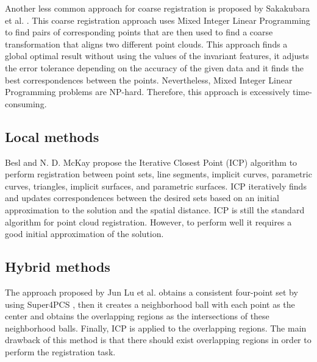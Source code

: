         Another less common approach for coarse registration is proposed by Sakakubara et al. \cite{Sakakubara_2007_automatic}.
        This coarse registration approach uses Mixed Integer Linear Programming to find pairs of corresponding points that are then 
        used to find a coarse transformation that aligns two different point clouds.
        This approach finds a global optimal result without using the values of the invariant features, 
        it adjusts the error tolerance depending on the accuracy of the given data and 
        it finds the best correspondences between the points.
        Nevertheless, Mixed Integer Linear Programming problems are NP-hard. Therefore, this approach is excessively time-consuming.

        \subsection{Local methods}

        Besl and N. D. McKay \cite{Besl_1992_amethod} propose the Iterative Closest Point (ICP) algorithm to perform registration 
        between point sets, line segments, implicit curves, parametric curves, triangles, implicit surfaces, and parametric surfaces.
        ICP iteratively finds and updates correspondences between the desired sets based on an initial approximation to the solution and 
        the spatial distance.
        ICP is still the standard algorithm for point cloud registration. However, to perform well it requires a good initial
        approximation of the solution.

        \subsection{Hybrid methods}

        The approach proposed by Jun Lu et al. \cite{Lu_2019_4pcsicp} obtains a consistent four-point set by using Super4PCS \cite{Mellado_2014_super4pcs}, 
        then it creates a neighborhood ball with each point as the center and obtains the overlapping regions as the intersections
        of these neighborhood balls. Finally, ICP is applied to the overlapping regions. The main drawback of this method is that 
        there should exist overlapping regions in order to perform the registration task.

